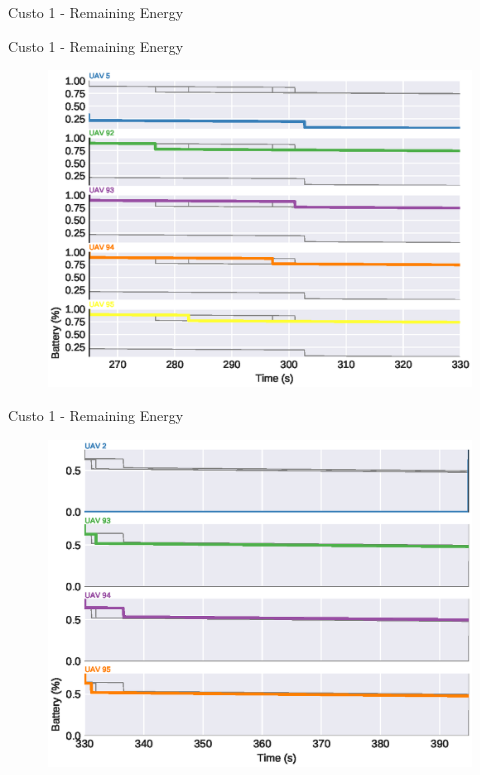 \begin{frame}{Custo 1 - Remaining Energy}
\begin{figure}[!htb]
                    \end{figure}
                \end{frame}\begin{frame}{Custo 1 - Remaining Energy}
                    \begin{figure}[!htb]
                        \includegraphics[width=\textwidth]{custo_1/uav_remaining_energy_330.eps}
                    \end{figure}
                \end{frame}\begin{frame}{Custo 1 - Remaining Energy}
                    \begin{figure}[!htb]
                        \includegraphics[width=\textwidth]{custo_1/uav_remaining_energy_395.eps}

\end{figure}
\end{frame}
